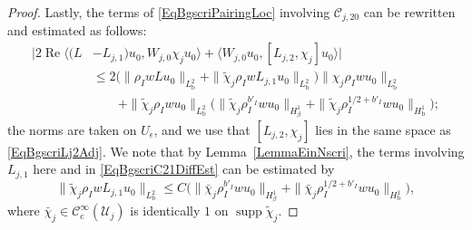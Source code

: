 \documentclass[reqno,11pt,letterpaper]{amsart}
\numberwithin{equation}{section}
\numberwithin{figure}{section}
\theoremstyle{definition}
\theoremstyle{remark}
\newcommand{\mc}{\mathcal}
\newcommand{\cC}{\mc C}
\newcommand{\cU}{\mc U}
\renewcommand{\Re}{\operatorname{Re}}
\newcommand{\supp}{\operatorname{supp}}
\newcommand{\eps}{\epsilon}
\newcommand{\la}{\langle}
\newcommand{\ra}{\rangle}
\newcommand{\wt}{\widetilde}
\newcommand{\bop}{{\mathrm{b}}}
\newcommand{\cp}{{\mathrm{c}}}
\newcommand{\CIc}{\cC^\infty_\cp}
\newcommand{\Hb}{H_{\bop}}
\newcommand{\Hbeta}{H_{\beta}}
\begin{document}
\begin{proof}
  Lastly, the terms of \eqref{EqBgscriPairingLoc} involving $\cC_{j,2 0}$ can be rewritten and estimated as follows:
  \begin{align*}
    \bigl|2\Re\la (L&-L_{j,1})u_0, W_{j,0}\chi_j u_0\ra + \la W_{j,0}u_0,[L_{j,2},\chi_j]u_0\ra\bigr| \\
    & \leq 2\bigl(\|\rho_I w L u_0\|_{L^2_\bop}+\|\wt\chi_j\rho_I w L_{j, 1}u_0\|_{L^2_\bop}\bigr) \|\chi_j\rho_I w u_0 \|_{L^2_\bop} \\
    &\qquad + \|\wt\chi_j\rho_I w u_0\|_{L^2_\bop}\bigl(\|\wt\chi_j\rho_I^{b'_I}w u_0\|_{\Hbeta^1}+\|\wt\chi_j\rho_I^{1/2+b'_I}w u_0\|_{\Hb^1}\bigr);
  \end{align*}
  the norms are taken on $U_\eps$, and we use that $[L_{j,2},\chi_j]$ lies in the same space as \eqref{EqBgscriLj2Adj}. We note that by Lemma~\ref{LemmaEinNscri}, the terms involving $L_{j,1}$ here and in \eqref{EqBgscriC21DiffEst} can be estimated by
  \[
    \|\wt\chi_j\rho_I w L_{j,1}u_0\|_{L^2_\bop} \leq C\bigl(\| \bar\chi_j\rho_I^{b'_I}w u_0\|_{\Hbeta^1}+\| \bar\chi_j\rho_I^{1/2+b'_I} w u_0\|_{\Hb^1}\bigr),
  \]
  where $\bar\chi_j\in\CIc(\cU_j)$ is identically $1$ on $\supp\wt\chi_j$.


\end{proof}
\end{document}
